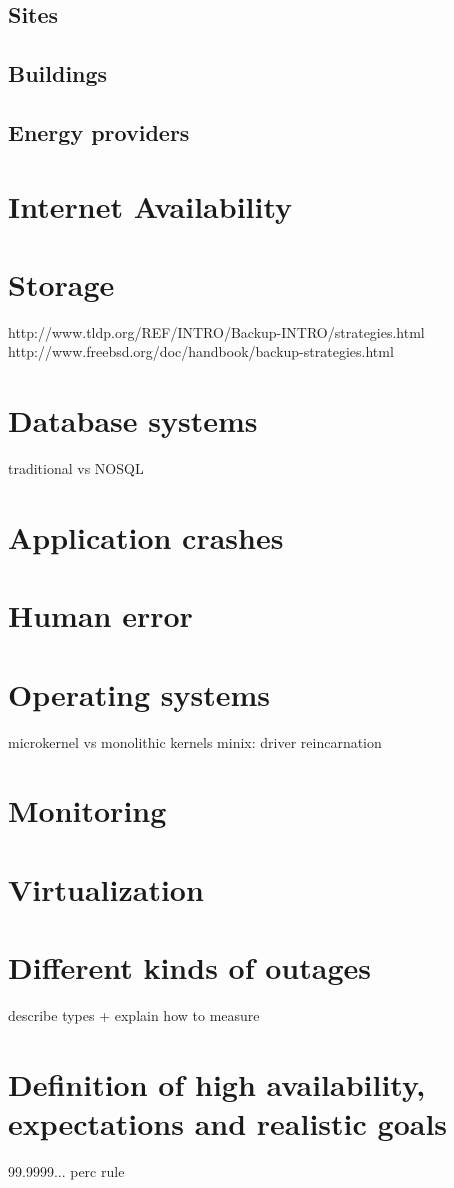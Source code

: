 \documentclass[12pt]{report}
\begin{document}
\subsection{Sites}
\subsection{Buildings}
\subsection{Energy providers}
\section{Internet Availability}
\section{Storage}
http://www.tldp.org/REF/INTRO/Backup-INTRO/strategies.html
http://www.freebsd.org/doc/handbook/backup-strategies.html
\section{Database systems}
traditional vs NOSQL
\section{Application crashes}
\section{Human error}
\section{Operating systems}
microkernel vs monolithic kernels
minix: driver reincarnation
\section{Monitoring}
\section{Virtualization}
\section{Different kinds of outages}
describe types + explain how to measure
\section{Definition of high availability, expectations and realistic
  goals}
99.9999... perc rule
\end{document}
